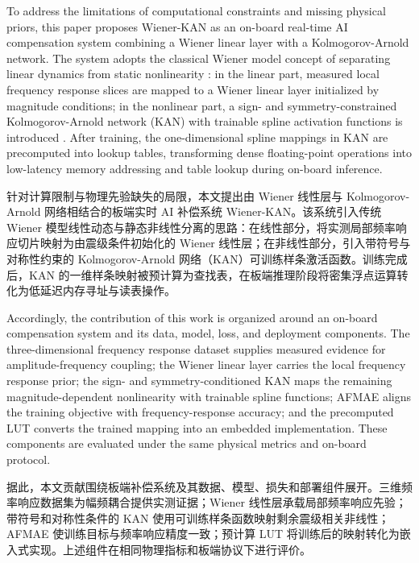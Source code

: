\documentclass[sn-nature]{sn-jnl}
\newif\ifCNENEnglish
\newif\ifCNENBilingual
\newcommand{\CNEN}[2]{%
    \ifCNENBilingual
        #1%
        \if\relax\detokenize{#2}\relax\else\par #2\fi%
    \else
        \ifCNENEnglish
            #2%
        \else
            #1%
        \fi
    \fi
}
\begin{document}
\CNEN{针对计算限制与物理先验缺失的局限，本文提出由 Wiener 线性层与 Kolmogorov-Arnold 网络相结合的板端实时 AI 补偿系统 Wiener-KAN。该系统引入传统 Wiener 模型线性动态与静态非线性分离的思路\cite{sersourNonlinearSystemIdentification2018}：在线性部分，将实测局部频率响应切片映射为由震级条件初始化的 Wiener 线性层；在非线性部分，引入带符号与对称性约束的 Kolmogorov-Arnold 网络（KAN）可训练样条激活函数\cite{schmidt-hieberKolmogorovArnoldRepresentation2021,liu2025kankolmogorovarnoldnetworks,alvesUseKolmogorovarnoldNetworks2024,livierisCKANNewApproach2024}。训练完成后，KAN 的一维样条映射被预计算为查找表，在板端推理阶段将密集浮点运算转化为低延迟内存寻址与读表操作。}{To address the limitations of computational constraints and missing physical priors, this paper proposes Wiener-KAN as an on-board real-time AI compensation system combining a Wiener linear layer with a Kolmogorov-Arnold network. The system adopts the classical Wiener model concept of separating linear dynamics from static nonlinearity \cite{sersourNonlinearSystemIdentification2018}: in the linear part, measured local frequency response slices are mapped to a Wiener linear layer initialized by magnitude conditions; in the nonlinear part, a sign- and symmetry-constrained Kolmogorov-Arnold network (KAN) with trainable spline activation functions is introduced \cite{schmidt-hieberKolmogorovArnoldRepresentation2021,liu2025kankolmogorovarnoldnetworks,alvesUseKolmogorovarnoldNetworks2024,livierisCKANNewApproach2024}. After training, the one-dimensional spline mappings in KAN are precomputed into lookup tables, transforming dense floating-point operations into low-latency memory addressing and table lookup during on-board inference.%
}

\CNEN{据此，本文贡献围绕板端补偿系统及其数据、模型、损失和部署组件展开。三维频率响应数据集为幅频耦合提供实测证据；Wiener 线性层承载局部频率响应先验；带符号和对称性条件的 KAN 使用可训练样条函数映射剩余震级相关非线性；AFMAE 使训练目标与频率响应精度一致；预计算 LUT 将训练后的映射转化为嵌入式实现。上述组件在相同物理指标和板端协议下进行评价。}{Accordingly, the contribution of this work is organized around an on-board compensation system and its data, model, loss, and deployment components. The three-dimensional frequency response dataset supplies measured evidence for amplitude-frequency coupling; the Wiener linear layer carries the local frequency response prior; the sign- and symmetry-conditioned KAN maps the remaining magnitude-dependent nonlinearity with trainable spline functions; AFMAE aligns the training objective with frequency-response accuracy; and the precomputed LUT converts the trained mapping into an embedded implementation. These components are evaluated under the same physical metrics and on-board protocol.}
\end{document}
